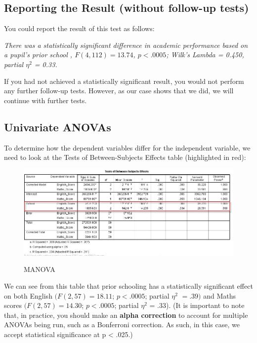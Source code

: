 \documentclass[a4paper,12pt]{article}
\begin{document}
\subsection{Reporting the Result (without follow-up tests)}
You could report the result of this test as follows:

\emph{
There was a statistically significant difference in academic performance based on a pupil's prior school , $F(4, 112) = 13.74$, $p < .0005$; Wilk's Lambda = 0.450, partial $\eta^2$ = 0.33.
}

If you had not achieved a statistically significant result, you would not perform any further follow-up tests. However, as our case shows that we did, we will continue with further tests.





\subsection{Univariate ANOVAs}
To determine how the dependent variables differ for the independent variable, we need to look at the Tests of Between-Subjects Effects table (highlighted in red):

\begin{center}
\begin{figure}[h!]
  \includegraphics[scale=0.5]{images/MANOVA9}\\
  \caption{MANOVA}
\end{figure}
\end{center}

We can see from this table that prior schooling has a statistically significant effect on both English $(F (2, 57) = 18.11$; $p < .0005$; partial $\eta^2$ $= .39)$ and Maths scores $(F (2, 57) = 14.30$; $p < .0005$; partial $\eta^2$ = .33).
(It is important to note that, in practice, you should make an \textbf{alpha correction} to account for multiple ANOVAs being run, such as a Bonferroni correction. As such, in this case, we accept statistical significance at p < .025.)
\end{document}
